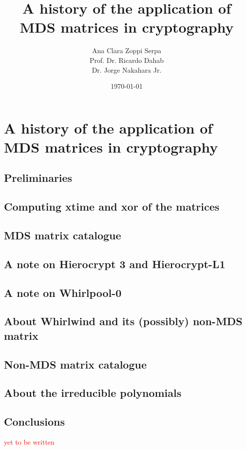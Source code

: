 \documentclass{report}
\title{A history of the application of MDS matrices in cryptography}
\author{Ana Clara Zoppi Serpa\\ Prof. Dr. Ricardo Dahab \\ Dr. Jorge Nakahara Jr.}
\date{\today}
\begin{document}

\maketitle

\tableofcontents

\chapter{A history of the application of MDS matrices in cryptography}


\section{Preliminaries}


\section{Computing \textbf{xtime} and \textbf{xor} of the matrices}


\section{MDS matrix catalogue}




\section{A note on Hierocrypt 3 and Hierocrypt-L1}


\section{A note on Whirlpool-0}\label{sec:whirlpool}


\section{About Whirlwind and its (possibly) non-MDS matrix}\label{sec:whirlwind-non-mds}


\section{Non-MDS matrix catalogue}


\section{About the irreducible polynomials}


\section{Conclusions}
\textcolor{red}{yet to be written}



\end{document}
